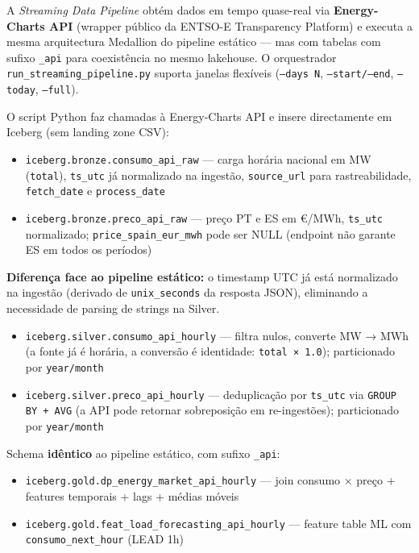 \documentclass[11pt,a4paper]{article}
\begin{document}
A \textit{Streaming Data Pipeline} obtém dados em tempo quase-real via \textbf{Energy-Charts API} (wrapper público da ENTSO-E Transparency Platform) e executa a mesma arquitectura Medallion do pipeline estático — mas com tabelas com sufixo \texttt{\_api} para coexistência no mesmo lakehouse. O orquestrador \texttt{run\_streaming\_pipeline.py} suporta janelas flexíveis (\texttt{--days N}, \texttt{--start/--end}, \texttt{--today}, \texttt{--full}).

\begin{description}[leftmargin=*]
  \item[\textbf{Bronze — Ingestão API}]
    O script Python faz chamadas à Energy-Charts API e insere directamente em Iceberg (sem landing zone CSV):
    \begin{itemize}[leftmargin=*,noitemsep]
      \item \texttt{iceberg.bronze.consumo\_api\_raw} — carga horária nacional em MW (\texttt{total}), \texttt{ts\_utc} já normalizado na ingestão, \texttt{source\_url} para rastreabilidade, \texttt{fetch\_date} e \texttt{process\_date}
      \item \texttt{iceberg.bronze.preco\_api\_raw} — preço PT e ES em €/MWh, \texttt{ts\_utc} normalizado; \texttt{price\_spain\_eur\_mwh} pode ser NULL (endpoint não garante ES em todos os períodos)
    \end{itemize}
    \textbf{Diferença face ao pipeline estático:} o timestamp UTC já está normalizado na ingestão (derivado de \texttt{unix\_seconds} da resposta JSON), eliminando a necessidade de parsing de strings na Silver.

  \item[\textbf{Silver — Validação e Deduplicação}]
    \begin{itemize}[leftmargin=*,noitemsep]
      \item \texttt{iceberg.silver.consumo\_api\_hourly} — filtra nulos, converte MW → MWh (a fonte já é horária, a conversão é identidade: \texttt{total × 1.0}); particionado por \texttt{year/month}
      \item \texttt{iceberg.silver.preco\_api\_hourly} — deduplicação por \texttt{ts\_utc} via \texttt{GROUP BY + AVG} (a API pode retornar sobreposição em re-ingestões); particionado por \texttt{year/month}
    \end{itemize}

  \item[\textbf{Gold — Produto Analítico e Feature Table}]
    Schema \textbf{idêntico} ao pipeline estático, com sufixo \texttt{\_api}:
    \begin{itemize}[leftmargin=*,noitemsep]
      \item \texttt{iceberg.gold.dp\_energy\_market\_api\_hourly} — join consumo × preço + features temporais + lags + médias móveis
      \item \texttt{iceberg.gold.feat\_load\_forecasting\_api\_hourly} — feature table ML com \texttt{consumo\_next\_hour} (LEAD 1h)
    \end{itemize}
\end{description}
\end{document}
